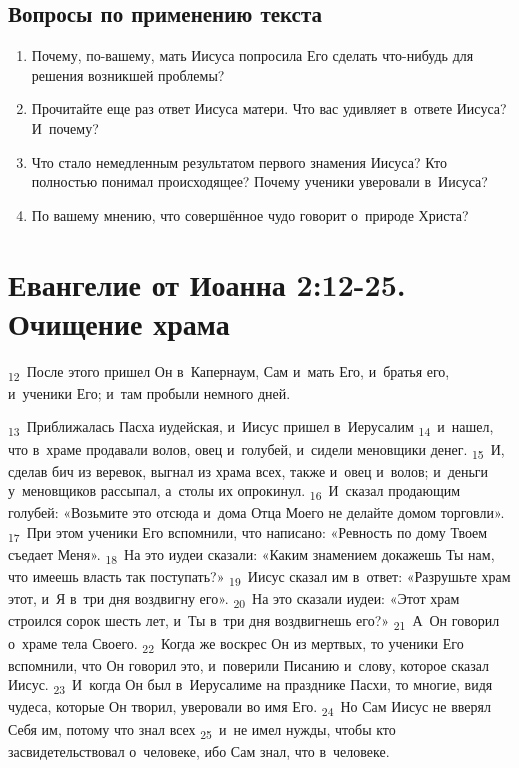 \documentclass[a4paper,12pt]{article}
\begin{document}
\subsection*{Вопросы по применению текста} 
\begin{enumerate}
    \item Почему, по-вашему, мать Иисуса попросила Его сделать что-нибудь для решения возникшей проблемы? 
    
    \myline
    
    \myline
    \item Прочитайте еще раз ответ Иисуса матери. Что вас удивляет в~ответе Иисуса? И~почему? 
    
    \myline
    
    \myline
    \item Что стало немедленным результатом первого знамения Иисуса? Кто полностью понимал происходящее? Почему ученики уверовали в~Иисуса? 
    
    \myline
    
    \myline
    \item По вашему мнению, что совершённое чудо говорит о~природе Христа? 

    \myline
    
    \myline
\end{enumerate}



\section{Евангелие от Иоанна 2:12-25. Очищение храма}

\textsubscript{12}~После этого пришел Он в~Капернаум, Сам и~мать Его, и~братья его, и~ученики Его; и~там пробыли немного дней. 

\textsubscript{13}~Приближалась Пасха иудейская, и~Иисус пришел в~Иерусалим \textsubscript{14}~и~нашел, что в~храме продавали волов, овец и~голубей, и~сидели меновщики денег. \textsubscript{15}~И, сделав бич из веревок, выгнал из храма всех, также и~овец и~волов; и~деньги у~меновщиков рассыпал, а~столы их опрокинул. \textsubscript{16}~И~сказал продающим голубей: «Возьмите это отсюда и~дома Отца Моего не делайте домом торговли». \textsubscript{17}~При этом ученики Его вспомнили, что написано: «Ревность по дому Твоем съедает Меня». \textsubscript{18}~На это иудеи сказали: «Каким знамением докажешь Ты нам, что имеешь власть так поступать?» \textsubscript{19}~Иисус сказал им в~ответ: «Разрушьте храм этот, и~Я в~три дня воздвигну его». \textsubscript{20}~На это сказали иудеи: «Этот храм строился сорок шесть лет, и~Ты в~три дня воздвигнешь его?» \textsubscript{21}~А~Он говорил о~храме тела Своего. \textsubscript{22}~Когда же воскрес Он из мертвых, то ученики Его вспомнили, что Он говорил это, и~поверили Писанию и~слову, которое сказал Иисус. \textsubscript{23}~И~когда Он был в~Иерусалиме на празднике Пасхи, то многие, видя чудеса, которые Он творил, уверовали во имя Его. \textsubscript{24}~Но Сам Иисус не вверял Себя им, потому что знал всех \textsubscript{25}~и~не имел нужды, чтобы кто засвидетельствовал о~человеке, ибо Сам знал, что в~человеке.
\end{document}
